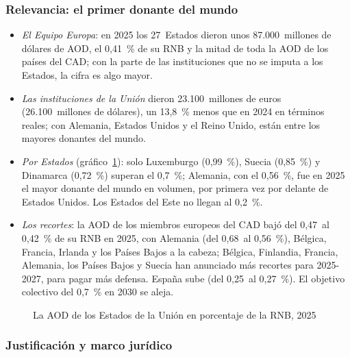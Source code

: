 \documentclass[11pt]{article}
\begin{document}
\subsubsection{Relevancia: el primer donante del mundo}\label{sec:relevancia-aod}

\begin{itemize}
\item \emph{El Equipo Europa}: en 2025 los 27~Estados dieron unos 87.000~millones de dólares de AOD, el 0,41~\% de su RNB y la mitad de toda la AOD de los países del CAD; con la parte de las instituciones que no se imputa a los Estados, la cifra es algo mayor\nocite{OCDE2026DAC1,OCDE2026AODPreliminar}.
\item \emph{Las instituciones de la Unión} dieron 23.100~millones de euros (26.100~millones de dólares), un 13,8~\% menos que en 2024 en términos reales; con Alemania, Estados Unidos y el Reino Unido, están entre los mayores donantes del mundo.
\item \emph{Por Estados} (gráfico~\ref{fig:aod-estados}): solo Luxemburgo (0,99~\%), Suecia (0,85~\%) y Dinamarca (0,72~\%) superan el 0,7~\%; Alemania, con el 0,56~\%, fue en 2025 el mayor donante del mundo en volumen, por primera vez por delante de Estados Unidos. Los Estados del Este no llegan al 0,2~\%.
\item \emph{Los recortes}: la AOD de los miembros europeos del CAD bajó del 0,47~al 0,42~\% de su RNB en 2025, con Alemania (del 0,68~al 0,56~\%), Bélgica, Francia, Irlanda y los Países Bajos a la cabeza; Bélgica, Finlandia, Francia, Alemania, los Países Bajos y Suecia han anunciado más recortes para 2025-2027, para pagar más defensa\nocite{OCDE2025Recortes}. España sube (del 0,25~al 0,27~\%). El objetivo colectivo del 0,7~\% en 2030 se aleja.
\end{itemize}

\begin{figure}[H]
\centering
\caption{La AOD de los Estados de la Unión en porcentaje de la RNB, 2025}\label{fig:aod-estados}
\end{figure}

\subsubsection{Justificación y marco jurídico}\label{sec:justificacion-coop}
\end{document}
